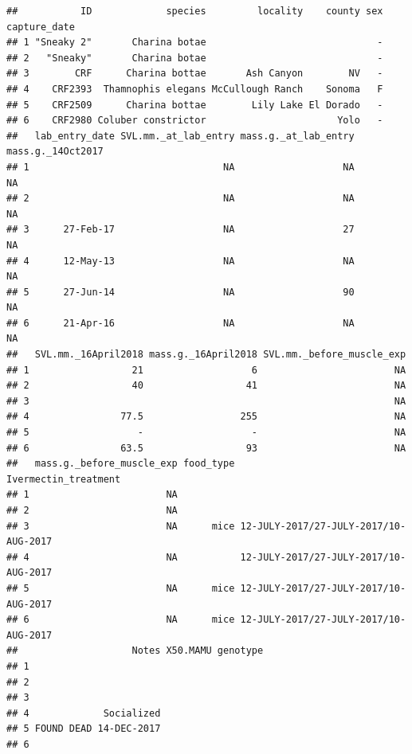 \documentclass[
]{article}
\begin{document}
\begin{verbatim}
##           ID             species         locality    county sex capture_date
## 1 "Sneaky 2"       Charina botae                              -             
## 2   "Sneaky"       Charina botae                              -             
## 3        CRF      Charina bottae       Ash Canyon        NV   -             
## 4    CRF2393  Thamnophis elegans McCullough Ranch    Sonoma   F             
## 5    CRF2509      Charina bottae        Lily Lake El Dorado   -             
## 6    CRF2980 Coluber constrictor                       Yolo   -             
##   lab_entry_date SVL.mm._at_lab_entry mass.g._at_lab_entry mass.g._14Oct2017
## 1                                  NA                   NA                NA
## 2                                  NA                   NA                NA
## 3      27-Feb-17                   NA                   27                NA
## 4      12-May-13                   NA                   NA                NA
## 5      27-Jun-14                   NA                   90                NA
## 6      21-Apr-16                   NA                   NA                NA
##   SVL.mm._16April2018 mass.g._16April2018 SVL.mm._before_muscle_exp
## 1                  21                   6                        NA
## 2                  40                  41                        NA
## 3                                                                NA
## 4                77.5                 255                        NA
## 5                   -                   -                        NA
## 6                63.5                  93                        NA
##   mass.g._before_muscle_exp food_type                  Ivermectin_treatment
## 1                        NA                                                
## 2                        NA                                                
## 3                        NA      mice 12-JULY-2017/27-JULY-2017/10-AUG-2017
## 4                        NA           12-JULY-2017/27-JULY-2017/10-AUG-2017
## 5                        NA      mice 12-JULY-2017/27-JULY-2017/10-AUG-2017
## 6                        NA      mice 12-JULY-2017/27-JULY-2017/10-AUG-2017
##                    Notes X50.MAMU genotype
## 1                                         
## 2                                         
## 3                                         
## 4             Socialized                  
## 5 FOUND DEAD 14-DEC-2017                  
## 6
\end{verbatim}
\end{document}
